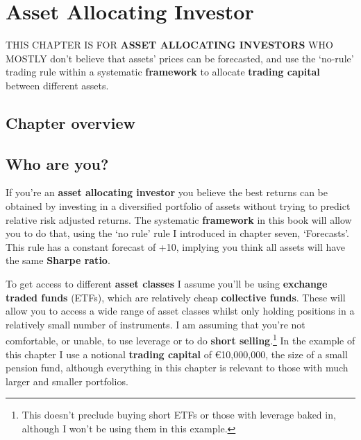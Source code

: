 \chapter{Asset Allocating Investor}

THIS CHAPTER IS FOR \textbf{ASSET ALLOCATING INVESTORS} WHO MOSTLY don't believe that assets' prices can be forecasted, and use the ‘no-rule' trading rule within a systematic \textbf{framework} to allocate \textbf{trading capital} between different assets.

\section*{Chapter overview}  {}

\begin{chapteroverviewtable}
\end{chapteroverviewtable}

\section*{Who are you?}  {}

If you're an \textbf{asset allocating investor} you believe the best returns can be obtained by investing in a diversified portfolio of assets without trying to predict relative risk adjusted returns. The systematic \textbf{framework} in this book will allow you to do that, using the ‘no rule' rule I introduced in chapter seven, ‘Forecasts'. This rule has a constant forecast of +10, implying you think all assets will have the same \textbf{Sharpe ratio}.

To get access to different \textbf{asset classes} I assume you'll be using \textbf{exchange traded funds} (ETFs), which are relatively cheap \textbf{collective funds}. These will allow you to access a wide range of asset classes whilst only holding positions in a relatively small number of instruments. I am assuming that you're not comfortable, or unable, to use leverage or to do \textbf{short selling}.\footnote{This doesn’t preclude buying short ETFs or those with leverage baked in, although I won’t be using them in this example.} In the example of this chapter I use a notional \textbf{trading capital} of €10,000,000, the size of a small pension fund, although everything in this chapter is relevant to those with much larger and smaller portfolios.


